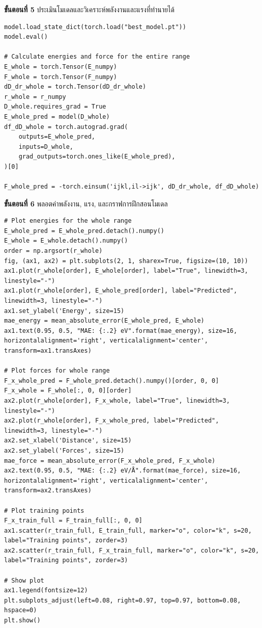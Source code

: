 \vspace{1em}

\textbf{ขั้นตอนที่ 5} ประเมินโมเดลและวิเคราะห์พลังงานและแรงที่ทำนายได้

\begin{lstlisting}[style=MyPython]
model.load_state_dict(torch.load("best_model.pt"))
model.eval()

# Calculate energies and force for the entire range
E_whole = torch.Tensor(E_numpy)
F_whole = torch.Tensor(F_numpy)
dD_dr_whole = torch.Tensor(dD_dr_whole)
r_whole = r_numpy
D_whole.requires_grad = True
E_whole_pred = model(D_whole)
df_dD_whole = torch.autograd.grad(
    outputs=E_whole_pred,
    inputs=D_whole,
    grad_outputs=torch.ones_like(E_whole_pred),
)[0]

F_whole_pred = -torch.einsum('ijkl,il->ijk', dD_dr_whole, df_dD_whole)
\end{lstlisting}

\vspace{1em}

\textbf{ขั้นตอนที่ 6} พลอตค่าพลังงาน, แรง, และกราฟการฝึกสอนโมเดล

\begin{lstlisting}[style=MyPython]
# Plot energies for the whole range
E_whole_pred = E_whole_pred.detach().numpy()
E_whole = E_whole.detach().numpy()
order = np.argsort(r_whole)
fig, (ax1, ax2) = plt.subplots(2, 1, sharex=True, figsize=(10, 10))
ax1.plot(r_whole[order], E_whole[order], label="True", linewidth=3, linestyle="-")
ax1.plot(r_whole[order], E_whole_pred[order], label="Predicted", linewidth=3, linestyle="-")
ax1.set_ylabel('Energy', size=15)
mae_energy = mean_absolute_error(E_whole_pred, E_whole)
ax1.text(0.95, 0.5, "MAE: {:.2} eV".format(mae_energy), size=16, horizontalalignment='right', verticalalignment='center', transform=ax1.transAxes)

# Plot forces for whole range
F_x_whole_pred = F_whole_pred.detach().numpy()[order, 0, 0]
F_x_whole = F_whole[:, 0, 0][order]
ax2.plot(r_whole[order], F_x_whole, label="True", linewidth=3, linestyle="-")
ax2.plot(r_whole[order], F_x_whole_pred, label="Predicted", linewidth=3, linestyle="-")
ax2.set_xlabel('Distance', size=15)
ax2.set_ylabel('Forces', size=15)
mae_force = mean_absolute_error(F_x_whole_pred, F_x_whole)
ax2.text(0.95, 0.5, "MAE: {:.2} eV/Å".format(mae_force), size=16, horizontalalignment='right', verticalalignment='center', transform=ax2.transAxes)

# Plot training points
F_x_train_full = F_train_full[:, 0, 0]
ax1.scatter(r_train_full, E_train_full, marker="o", color="k", s=20, label="Training points", zorder=3)
ax2.scatter(r_train_full, F_x_train_full, marker="o", color="k", s=20, label="Training points", zorder=3)

# Show plot
ax1.legend(fontsize=12)
plt.subplots_adjust(left=0.08, right=0.97, top=0.97, bottom=0.08, hspace=0)
plt.show()
\end{lstlisting}


